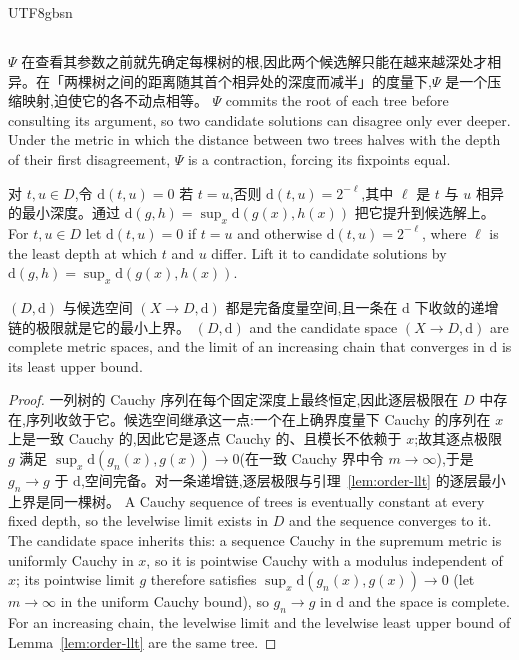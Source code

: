 \begin{CJK*}{UTF8}{gbsn}
  \subsection{}\label{sec:order}

  \ifTablambdaChinese
  $\Psi$ 在查看其参数之前就先确定每棵树的根,因此两个候选解只能在越来越深处才相异。在「两棵树之间的距离随其首个相异处的深度而减半」的度量下,$\Psi$ 是一个压缩映射,迫使它的各不动点相等。
  \else
  $\Psi$ commits the root of each tree before consulting its argument, so two candidate solutions can disagree only ever deeper. Under the metric in which the distance between two trees halves with the depth of their first disagreement, $\Psi$ is a contraction, forcing its fixpoints equal.
  \fi

  \begin{definition}\label{def:metric}
    \ifTablambdaChinese
    对 $t, u \in D$,令 $\mathrm{d}(t, u) = 0$ 若 $t = u$,否则 $\mathrm{d}(t, u) = 2^{-\ell}$,其中 $\ell$ 是 $t$ 与 $u$ 相异的最小深度。通过 $\mathrm{d}(g, h) = \sup_x \mathrm{d}(g(x), h(x))$ 把它提升到候选解上。
    \else
    For $t, u \in D$ let $\mathrm{d}(t, u) = 0$ if $t = u$ and otherwise $\mathrm{d}(t, u) = 2^{-\ell}$, where $\ell$ is the least depth at which $t$ and $u$ differ. Lift it to candidate solutions by $\mathrm{d}(g, h) = \sup_x \mathrm{d}(g(x), h(x))$.
    \fi
  \end{definition}

  \begin{lemma}\label{lem:metric}
    \ifTablambdaChinese
    $(D, \mathrm{d})$ 与候选空间 $(X \to D, \mathrm{d})$ 都是完备度量空间,且一条在 $\mathrm{d}$ 下收敛的递增链的极限就是它的最小上界。
    \else
    $(D, \mathrm{d})$ and the candidate space $(X \to D, \mathrm{d})$ are complete metric spaces, and the limit of an increasing chain that converges in $\mathrm{d}$ is its least upper bound.
    \fi
  \end{lemma}
  \begin{proof}
    \ifTablambdaChinese
    一列树的 Cauchy 序列在每个固定深度上最终恒定,因此逐层极限在 $D$ 中存在,序列收敛于它。候选空间继承这一点:一个在上确界度量下 Cauchy 的序列在 $x$ 上是一致 Cauchy 的,因此它是逐点 Cauchy 的、且模长不依赖于 $x$;故其逐点极限 $g$ 满足 $\sup_x \mathrm{d}(g_n(x), g(x)) \to 0$(在一致 Cauchy 界中令 $m \to \infty$),于是 $g_n \to g$ 于 $\mathrm{d}$,空间完备。对一条递增链,逐层极限与引理~\ref{lem:order-llt} 的逐层最小上界是同一棵树。
    \else
    A Cauchy sequence of trees is eventually constant at every fixed depth, so the levelwise limit exists in $D$ and the sequence converges to it. The candidate space inherits this: a sequence Cauchy in the supremum metric is uniformly Cauchy in $x$, so it is pointwise Cauchy with a modulus independent of $x$; its pointwise limit $g$ therefore satisfies $\sup_x \mathrm{d}(g_n(x), g(x)) \to 0$ (let $m \to \infty$ in the uniform Cauchy bound), so $g_n \to g$ in $\mathrm{d}$ and the space is complete. For an increasing chain, the levelwise limit and the levelwise least upper bound of Lemma~\ref{lem:order-llt} are the same tree.
    \fi
  \end{proof}


\end{CJK*}
